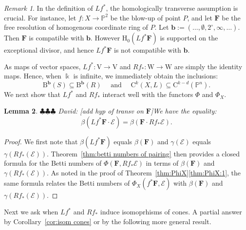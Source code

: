 \documentclass[12pt]{amsart}
\newtheorem{lemma}{Lemma}[section]
\theoremstyle{definition}
\theoremstyle{remark}
\newtheorem{remark}[lemma]{Remark}
\newcommand{\kk}{\Bbbk}
\newcommand{\PP}{\mathbb{P}}
\newcommand{\HH}{\mathrm{H}}
\newcommand{\VV}{\mathrm{V}}
\newcommand{\WW}{\mathrm{W}}
\newcommand{\bb}{\mathbf{b}}
\newcommand{\cO}{\mathcal{O}}
\newcommand{\cE}{\mathcal{E}}
\newcommand{\FF}{\mathbf{F}}
\newcommand{\zp}{\circ}
\newcommand{\CQ}{\mathrm{C}}
\newcommand{\BBQ}{\mathrm{B}}
\newcommand{\david}[1]{{\color{red} \sf $\clubsuit\clubsuit\clubsuit$ David: [#1]}}
\begin{document}
\begin{remark}
In the definition of $Lf^*$, the homologically transverse assumption is crucial.  For instance, let $f: X\to \PP^2$ be the blow-up of point $P$, and let $\FF$ be the free resolution of homogenous coordinate ring of $P$.  Let $\bb:=(\dots,\emptyset, 2^\zp,\infty,\dots)$.  Then $\FF$ is compatible with $\bb$.  However $\HH_0(Lf^*\FF)$ is supported on the exceptional divisor, and hence $Lf^*\FF$ is not compatible with $\bb$.
\end{remark}

As maps of vector spaces, $Lf^*\colon \VV\to \VV$ and $Rf_*\colon \WW\to \WW$ are simply the identity maps.  Hence, when $\kk$ is infinite, we immediately obtain the inclusions:
\[
\BBQ^{\bb}(S)\subseteq \BBQ^{\bb}(R) \quad \text{ and } \quad \CQ^k(X,L)\subseteq \CQ^{k-d}(\PP^n).
\]
We next show that $Lf^*$ and $Rf_*$ interact well with the functors $\Phi$ and $\Phi_X$.

\begin{lemma}\label{lem:general pairing}
\david{add hyp of transv on $\FF$}We have the equality:
\[
\beta(Lf^*\FF\cdot \cE)=\beta(\FF\cdot Rf_*\cE).
\]
\end{lemma}
\begin{proof}
We first note that $\beta(Lf^*\FF)$ equals $\beta(\FF)$ and $\gamma(\cE)$ equals $\gamma(Rf_*(\cE))$.  Theorem~\ref{thm:betti numbers of pairing} then provides a closed formula for the Betti numbers of $\Phi(\FF,Rf_*\cE)$ in terms of $\beta(\FF)$ and $\gamma(Rf_*(\cE))$.  As noted in the proof of Theorem~\ref{thm:PhiX}\eqref{thm:PhiX:1}, the same formula relates the Betti numbers of $\Phi_X(f^*\FF,\cE)$ with  $\beta(\FF)$ and $\gamma(Rf_*(\cE))$.
\end{proof}


%
Next we ask when $Lf^*$ and $Rf_*$ induce isomoprhisms of cones.  A partial answer by Corollary~\ref{cor:isom cones} or by the following more general result.
\end{document}
